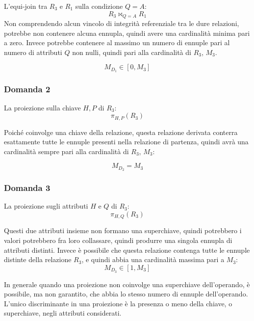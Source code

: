 \documentclass{article}
\numberwithin{equation}{subsection}
\begin{document}
L'equi-join tra $R_3$ e $R_1$ sulla condizione $Q=A$:
\begin{equation*}
    R_3\Join_{Q=A}R_1
\end{equation*}
Non comprendendo alcun vincolo di integrità referenziale tra le dure relazioni, potrebbe non contenere alcuna ennupla, quindi avere una cardinalità minima pari a zero. 
Invece potrebbe contenere al massimo un numero di ennuple pari al numero di attributi $Q$ non nulli, quindi pari alla cardinalità di $R_3$, $M_3$. 

\begin{equation}
    M_{D_1}\in[0,M_3]
\end{equation}

\subsubsection*{Domanda 2}

La proiezione sulla chiave $H,P$ di $R_3$:
\begin{equation*}
    \pi_{H,P}(R_3)
\end{equation*}

Poiché coinvolge una chiave della relazione, questa relazione derivata conterra esattamente tutte le ennuple presenti nella relazione di partenza, quindi avrà una cardinalità sempre pari 
alla cardinalità di $R_3$, $M_3$: 

\begin{equation}
    M_{D_2}=M_3
\end{equation}

\subsubsection*{Domanda 3}

La proiezione sugli attributi $H$ e $Q$ di $R_3$:
\begin{equation*}
    \pi_{H,Q}(R_3)
\end{equation*}

Questi due attributi insieme non formano una superchiave, quindi potrebbero i valori potrebbero fra loro collassare, quindi produrre una singola ennupla di attributi distinti. Invece è 
possibile che questa relazione contenga tutte le ennuple distinte della relazione $R_3$, e quindi abbia una cardinalità massima pari a $M_3$:
\begin{equation}
    M_{D_3}\in[1,M_3]
\end{equation}

In generale quando una proiezione non coinvolge una superchiave dell'operando, è possibile, ma non garantito, che abbia lo stesso numero di ennuple dell'operando. L'unico discriminante in una proiezione è la presenza 
o meno della chiave, o superchiave, negli attributi considerati. 
\end{document}

